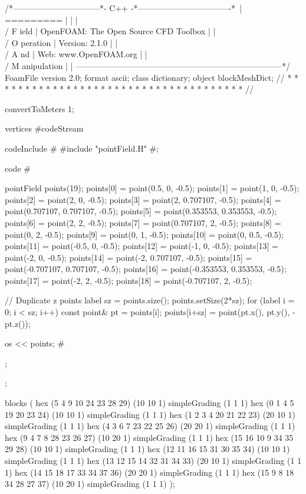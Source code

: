 \begin{OFverbatim}
/*--------------------------------*- C++ -*----------------------------------*\
| =========                 |                                                 |
| \\      /  F ield         | OpenFOAM: The Open Source CFD Toolbox           |
|  \\    /   O peration     | Version:  2.1.0                                 |
|   \\  /    A nd           | Web:      www.OpenFOAM.org                      |
|    \\/     M anipulation  |                                                 |
\*---------------------------------------------------------------------------*/
FoamFile
{
    version     2.0;
    format      ascii;
    class       dictionary;
    object      blockMeshDict;
}
// * * * * * * * * * * * * * * * * * * * * * * * * * * * * * * * * * * * * * //

convertToMeters 1;

vertices #codeStream
{
    codeInclude
    #{
        #include "pointField.H"
    #};

    code
    #{
        pointField points(19);
        points[0]  = point(0.5, 0, -0.5);
        points[1]  = point(1, 0, -0.5);
        points[2]  = point(2, 0, -0.5);
        points[3]  = point(2, 0.707107, -0.5);
        points[4]  = point(0.707107, 0.707107, -0.5);
        points[5]  = point(0.353553, 0.353553, -0.5);
        points[6]  = point(2, 2, -0.5);
        points[7]  = point(0.707107, 2, -0.5);
        points[8]  = point(0, 2, -0.5);
        points[9]  = point(0, 1, -0.5);
        points[10] = point(0, 0.5, -0.5);
        points[11] = point(-0.5, 0, -0.5);
        points[12] = point(-1, 0, -0.5);
        points[13] = point(-2, 0, -0.5);
        points[14] = point(-2, 0.707107, -0.5);
        points[15] = point(-0.707107, 0.707107, -0.5);
        points[16] = point(-0.353553, 0.353553, -0.5);
        points[17] = point(-2, 2, -0.5);
        points[18] = point(-0.707107, 2, -0.5);

        // Duplicate z points
        label sz = points.size();
        points.setSize(2*sz);
        for (label i = 0; i < sz; i++)
        {
            const point& pt = points[i];
            points[i+sz] = point(pt.x(), pt.y(), -pt.z());
        }

        os  << points;
    #};
};


blocks          
(
    hex (5 4 9 10 24 23 28 29) (10 10 1) simpleGrading (1 1 1)
    hex (0 1 4 5 19 20 23 24) (10 10 1) simpleGrading (1 1 1)
    hex (1 2 3 4 20 21 22 23) (20 10 1) simpleGrading (1 1 1)
    hex (4 3 6 7 23 22 25 26) (20 20 1) simpleGrading (1 1 1)
    hex (9 4 7 8 28 23 26 27) (10 20 1) simpleGrading (1 1 1)
    hex (15 16 10 9 34 35 29 28) (10 10 1) simpleGrading (1 1 1)
    hex (12 11 16 15 31 30 35 34) (10 10 1) simpleGrading (1 1 1)
    hex (13 12 15 14 32 31 34 33) (20 10 1) simpleGrading (1 1 1)
    hex (14 15 18 17 33 34 37 36) (20 20 1) simpleGrading (1 1 1)
    hex (15 9 8 18 34 28 27 37) (10 20 1) simpleGrading (1 1 1)
);


\end{OFverbatim}
